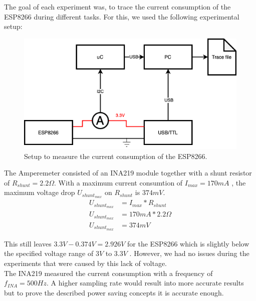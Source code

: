 The goal of each experiment was, to trace the current consumption of the ESP8266 during different tasks.
For this, we used the following experimental setup:

\begin{figure}[h]
    \centering
    \includegraphics[width = \linewidth]{fig/experimental_setup.png}
    \caption{Setup to measure the current consumption of the ESP8266.}
    \label{fig:experiment_setup}
\end{figure}

The Amperemeter consisted of an INA219 module together with a shunt resistor of $R_{shunt} = 2.2 \Omega$.
With a maximum current consumtion of $I_{max}=170 mA$ \cite{espressif_inc_esp8266_2016}, the maximum voltage drop $U_{shunt_{max}}$ on $R_{shunt}$ is $374mV$.
\begin{align*}
    U_{shunt_{max}} &= I_{max} * R_{shunt}\\
    U_{shunt_{max}} &= 170mA * 2.2 \Omega\\
    U_{shunt_{max}} &= 374mV
\end{align*}

This still leaves $3.3V - 0.374V = 2.926V$ for the ESP8266 which is slightly below the specified voltage range of $3V$ to $3.3V$ \cite{espressif_inc_esp8266_2016}.
However, we had no issues during the experiments that were caused by this lack of voltage.\\
The INA219 measured the current consumption with a frequency of $f_{INA} = 500Hz$.
A higher sampling rate would result into more accurate results but to prove the described power saving concepts it is accurate enough.
